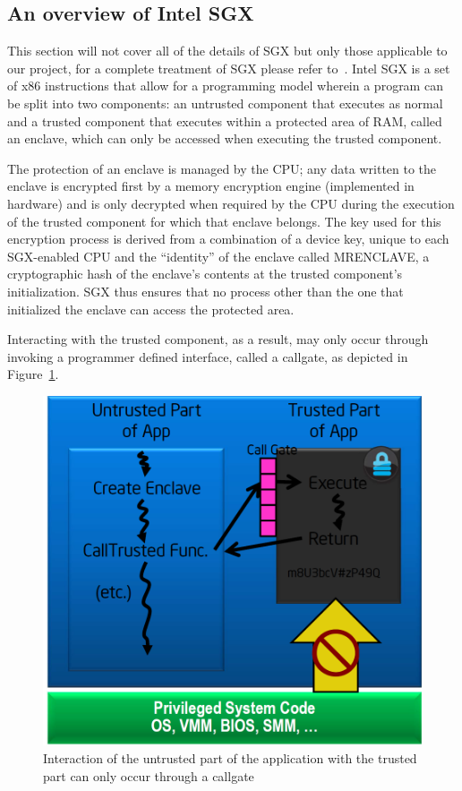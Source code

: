 \documentclass[../main.tex]{subfiles}
\begin{document}
\subsection{An overview of Intel SGX} %
This section will not cover all of the details of SGX but only those applicable to our project, for a complete treatment
of SGX please refer to~\cite{IntelCorporation2010}. Intel SGX is a set of x86 instructions that allow for a programming model wherein a
program can be split into two components: an untrusted component that executes as normal and a trusted component that executes
within a protected area of RAM, called an enclave, which can only be accessed when executing the trusted component. 

The protection of an enclave is managed by the CPU; any data written to the enclave is encrypted first by a memory encryption engine (implemented in hardware) 
and is only decrypted when required by the CPU during the execution of the trusted component for which that enclave belongs. The key used for this encryption process
is derived from a combination of a device key, unique to each SGX-enabled CPU and the ``identity'' of the enclave called MRENCLAVE, a cryptographic hash of the enclave's contents
at the trusted component's initialization. SGX thus ensures that no process other than the one that initialized the enclave can access the protected area. 

Interacting with the trusted component, as a result, may only occur through invoking a programmer defined interface, called a callgate, as depicted in Figure~\ref{fig:sgxhighlevel}.

\begin{figure}[H]
	\centering
	\includegraphics[scale=0.25]{images/sgxhighlevel.png}
	\caption{Interaction of the untrusted part of the application with the trusted part can only occur through a callgate}
	\label{fig:sgxhighlevel}
\end{figure}
\end{document}
